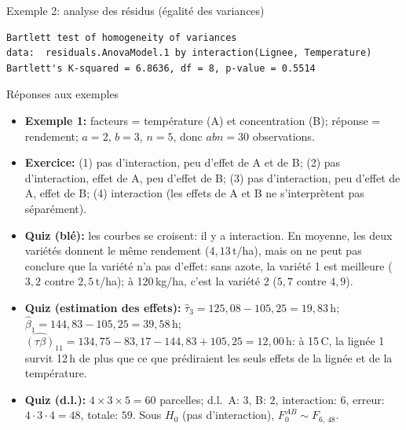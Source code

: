 \documentclass{BeamerTemplate}
\begin{document}
\begin{frame}[fragile,t]{Exemple 2: analyse des résidus (égalité des variances)}
\begin{center}
\end{center}

\begin{Verbatim}[fontsize=\scriptsize]
        Bartlett test of homogeneity of variances
data:  residuals.AnovaModel.1 by interaction(Lignee, Temperature)
Bartlett's K-squared = 6.8636, df = 8, p-value = 0.5514
\end{Verbatim}

\end{frame}

\begin{frame}[t]{Réponses aux exemples}

\scriptsize
\begin{itemize}\itemsep1.5mm
  \item \textbf{Exemple 1:} facteurs = température (A) et concentration (B);
  réponse = rendement; $a=2$, $b=3$, $n=5$, donc $abn=30$ observations.
  \item \textbf{Exercice:} (1) pas d'interaction, peu d'effet de A et de B;
  (2) pas d'interaction, effet de A, peu d'effet de B;
  (3) pas d'interaction, peu d'effet de A, effet de B;
  (4) interaction (les effets de A et B ne s'interprètent pas séparément).
  \item \textbf{Quiz (blé):} les courbes se croisent: il y a interaction. En moyenne,
  les deux variétés donnent le même rendement ($4{,}13$\,t/ha), mais on ne peut pas
  conclure que la variété n'a pas d'effet: sans azote, la variété 1 est meilleure
  ($3{,}2$ contre $2{,}5$\,t/ha); à 120\,kg/ha, c'est la variété 2 ($5{,}7$ contre $4{,}9$).
  \item \textbf{Quiz (estimation des effets):}
  $\hat\tau_3=125{,}08-105{,}25=19{,}83$\,h;
  $\hat\beta_1=144{,}83-105{,}25=39{,}58$\,h;
  $\widehat{(\tau\beta)}_{11}=134{,}75-83{,}17-144{,}83+105{,}25=12{,}00$\,h: à 15\,\textdegree C,
  la lignée 1 survit 12\,h de plus que ce que prédiraient les seuls effets de la lignée
  et de la température.
  \item \textbf{Quiz (d.l.):} $4\times3\times5=60$ parcelles; d.l.\ A: $3$, B: $2$,
  interaction: $6$, erreur: $4\cdot3\cdot4=48$, totale: $59$. Sous $H_0$ (pas
  d'interaction), $F_0^{AB}\sim F_{6,\,48}$.
\end{itemize}

\end{frame}
\end{document}
